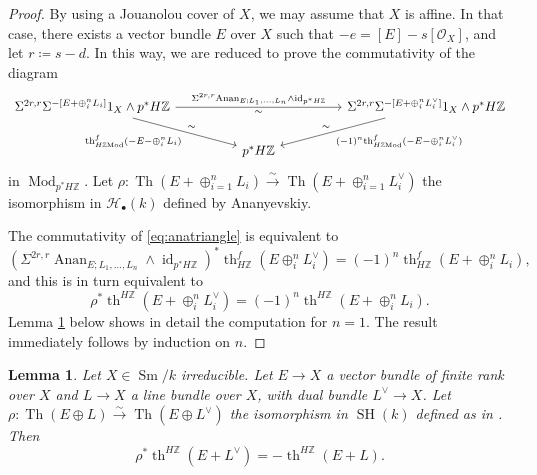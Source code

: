 \documentclass[10pt]{amsart}
\theoremstyle{definition}
\theoremstyle{plain}
\newtheorem{lemma}[defn]{Lemma}
\numberwithin{equation}{section}
\newcommand{\0}{\emptyset}
\newcommand{\sH}{{\mathcal H}}
\newcommand{\sO}{{\mathcal O}}
\newcommand{\Z}{{\mathbb Z}}
\newcommand{\SH}{{\operatorname{SH}}}
\newcommand{\Th}{{\operatorname{Th}}}
\newcommand{\Sm}{{\operatorname{Sm}}}
\renewcommand{\th}{{\operatorname{th}}}
\newcommand{\Mod}{{\operatorname{Mod}}}
\newcommand{\id}{{\operatorname{id}}}
\newcommand{\Anan}{{\operatorname{Anan}}}
\begin{document}
\begin{proof}
    By using a Jouanolou cover of $X$, we may assume that $X$ is affine. In that case, there exists a vector bundle $E$ over $X$ such that $-e=[E]-s[\sO_X]$, and let $r \coloneqq s-d$. In this way, we are reduced to prove the commutativity of the diagram
    \begin{equation}
    \label{eq:anatriangle}
         \begin{tikzcd}
        \Sigma^{2r,r}\Sigma^{-[E +\oplus_i^nL_i]}1_X \wedge p^*H\Z \arrow[rrrr, "\Sigma^{2r,r}\Anan_{E;L_1,\ldots,L_n} \wedge \id_{p^*H\Z}", "\sim"'] \arrow[drr, swap, "\th^f_{H\Z \Mod} (-E-\oplus_i^nL_i)", "\sim"'] &&&&  \Sigma^{2r,r}\Sigma^{-[E +\oplus_i^nL_i^{\vee}]}1_X \wedge p^*H\Z \arrow[dll, "(-1)^n\th^f_{H\Z \Mod} (-E-\oplus_i^nL_i^\vee)", "\sim"'] \\
        &&p^*H\Z&&
    \end{tikzcd}
    \end{equation}
    in $\Mod_{p^*H\Z}$. Let $\rho:\Th(E +\oplus_{i=1}^nL_i)\xrightarrow{\sim}\Th(E + \oplus_{i=1}^nL_i^\vee)$ the isomorphism in $\sH_{\bullet}(k)$ defined by Ananyevskiy.
    
    The commutativity of \eqref{eq:anatriangle} is equivalent to
    $$(\Sigma^{2r,r}\Anan_{E;L_1,\ldots,L_n} \wedge \id_{p^*H\Z})^*\th_{H\Z}^f (E\oplus_i^nL_i^\vee) =(-1)^n \th_{H\Z}^f (E+\oplus_i^nL_i),$$
    and this is in turn equivalent to
    $$\rho^*\th^{H\Z} (E+\oplus_i^nL_i^\vee) = (-1)^n \th^{H\Z} (E+\oplus_i^nL_i).$$
    Lemma \ref{lemma:anatwists} below shows in detail the computation for $n=1$. The result immediately follows by induction on $n$.
\end{proof}

\begin{lemma}
\label{lemma:anatwists}
    Let $X \in \Sm/k$ irreducible. Let $E \to X$ a vector bundle of finite rank over $X$ and $L \to X$ a line bundle over $X$, with dual bundle $L^{\vee}\to X$. Let $\rho: \Th(E\oplus L) \xrightarrow{\sim} \Th(E \oplus L^\vee)$ the isomorphism in $\SH(k)$ defined as in \cite[Lemma 4.1]{Ana:Slor}. Then $$\rho^*\th^{H\mathbb{Z}}(E + L^{\vee})=-\th^{H\mathbb{Z}}(E+L).$$
\end{lemma}
\end{document}
